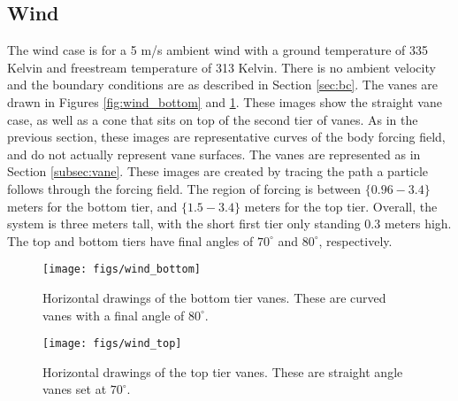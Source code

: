 \subsection{Wind}

The wind case is for a 5 m/s ambient wind with a ground temperature of
335 Kelvin and freestream temperature of 313 Kelvin. There is no ambient
velocity and the boundary conditions are as described in Section
\ref{sec:bc}. The vanes are drawn in Figures \ref{fig:wind_bottom} and
\ref{fig:wind_top}. These images show the straight vane case, as well as
a cone that sits on top of the second tier of vanes. 
As in the previous section, these images are representative
curves of the body forcing field, and do not actually represent vane
surfaces. The vanes are represented as in Section \ref{subsec:vane}. 
These images are created by tracing the path a particle follows through
the forcing field. The region of forcing is between $\{0.96-3.4\}$ meters
for the bottom tier, and $\{1.5-3.4\}$ meters for the top tier. Overall,
the system is three meters tall, with the short first tier only standing
0.3 meters high. The top and bottom tiers have final angles of
$70^{\circ}$ and $80^{\circ}$, respectively. 

\begin{figure}[htb]
\centering
\begin{minipage}{0.45\textwidth}
\centering
 \texttt{[image: figs/wind\_bottom]}
 \caption{Horizontal drawings of the bottom tier vanes. These are curved 
 vanes with a final angle of $80^{\circ}$.}
 \label{fig:wind_bottom}  
\end{minipage}\hfill
\begin{minipage}{0.45\textwidth}
\centering
\texttt{[image: figs/wind\_top]}
\caption{Horizontal drawings of the top tier vanes. These are straight
 angle vanes set at $70^{\circ}$.} 
 \label{fig:wind_top}  
\end{minipage}
\end{figure}


